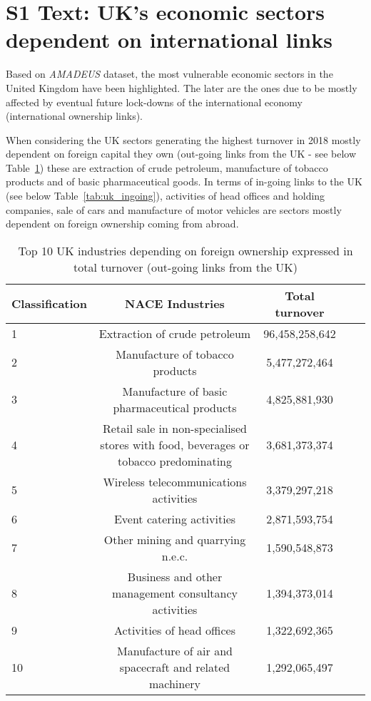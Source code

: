 

\renewcommand{\thetable}{S1-\Alph{table}}


\vspace*{0.35in}
\justify

\section*{S1 Text: UK's economic sectors dependent on international links}



Based on \emph {AMADEUS} dataset, the most vulnerable economic sectors in the United Kingdom have been highlighted. The later are the ones due to be mostly affected by eventual future lock-downs of the international economy (international ownership links). 

When considering the UK sectors generating the highest turnover in 2018 mostly dependent on foreign capital they own (out-going links from the UK - see below Table~\ref{tab:uk_outgoing}) these are extraction of crude petroleum, manufacture of tobacco products and of basic pharmaceutical goods. In terms of in-going links to the UK (see below Table~\ref{tab:uk_ingoing}), activities of head offices and holding companies, sale of cars and manufacture of motor vehicles are sectors mostly dependent on foreign ownership coming from abroad.

\FloatBarrier

\begin{table}[!ht]
\begin{adjustwidth}{-2.25in}{0in}
\caption{Top 10 UK industries depending on foreign ownership expressed in total turnover (out-going links from the UK)\label{tab:uk_outgoing}}
\centering
\medskip
\begin{tabular}{|l|c|c|c|c|}
\hline
Classification  & NACE Industries & Total turnover \\ 
\hline
1 &     Extraction of crude petroleum &   96,458,258,642  \\
\hline
2 & Manufacture of tobacco products &  5,477,272,464  \\
\hline
3 & Manufacture of basic pharmaceutical products &  4,825,881,930 \\
\hline
4 &  Retail sale in non-specialised stores with food, beverages or tobacco predominating  &   3,681,373,374  \\
\hline
5 &  Wireless telecommunications activities &   3,379,297,218  \\
\hline
6 & Event catering activities & 2,871,593,754  \\
\hline
7 &  Other mining and quarrying n.e.c. &  1,590,548,873  \\
\hline
8 & Business and other management consultancy activities &  1,394,373,014 \\
\hline
9 &  Activities of head offices &  1,322,692,365 \\
\hline
10 & Manufacture of air and spacecraft and related machinery &  1,292,065,497 \\
\hline
\end{tabular}
\end{adjustwidth}
\end{table}

